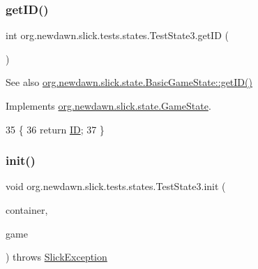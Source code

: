 \subsubsection{\texorpdfstring{get\+I\+D()}{getID()}}
{\footnotesize\ttfamily int org.\+newdawn.\+slick.\+tests.\+states.\+Test\+State3.\+get\+ID (\begin{DoxyParamCaption}{ }\end{DoxyParamCaption})\hspace{0.3cm}{\ttfamily [inline]}}

\begin{DoxySeeAlso}{See also}
\mbox{\hyperlink{classorg_1_1newdawn_1_1slick_1_1state_1_1_basic_game_state_a781ce2b3d6dd9b9853adb011f5e75cf7}{org.\+newdawn.\+slick.\+state.\+Basic\+Game\+State\+::get\+I\+D()}} 
\end{DoxySeeAlso}


Implements \mbox{\hyperlink{interfaceorg_1_1newdawn_1_1slick_1_1state_1_1_game_state_a54f2bc6a91feaf0614a5ef19f1d03313}{org.\+newdawn.\+slick.\+state.\+Game\+State}}.


\begin{DoxyCode}
35                        \{
36         \textcolor{keywordflow}{return} \mbox{\hyperlink{classorg_1_1newdawn_1_1slick_1_1tests_1_1states_1_1_test_state3_aa6764107cd40c552a44fae60571ad04f}{ID}};
37     \}
\end{DoxyCode}
\mbox{\label{classorg_1_1newdawn_1_1slick_1_1tests_1_1states_1_1_test_state3_ad83c2a6d037e5d73d45f0ffea9d332cc}} 
\subsubsection{\texorpdfstring{init()}{init()}}
{\footnotesize\ttfamily void org.\+newdawn.\+slick.\+tests.\+states.\+Test\+State3.\+init (\begin{DoxyParamCaption}\item[{\mbox{\hyperlink{classorg_1_1newdawn_1_1slick_1_1_game_container}{Game\+Container}}}]{container,  }\item[{\mbox{\hyperlink{classorg_1_1newdawn_1_1slick_1_1state_1_1_state_based_game}{State\+Based\+Game}}}]{game }\end{DoxyParamCaption}) throws \mbox{\hyperlink{classorg_1_1newdawn_1_1slick_1_1_slick_exception}{Slick\+Exception}}\hspace{0.3cm}{\ttfamily [inline]}}

